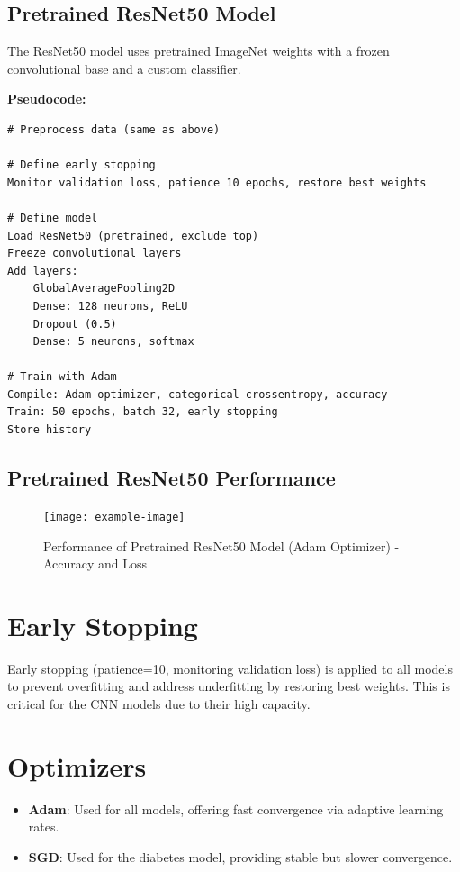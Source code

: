 \documentclass[a4paper,12pt]{article}
\begin{document}
\subsection*{Pretrained ResNet50 Model}
The ResNet50 model uses pretrained ImageNet weights with a frozen convolutional base and a custom classifier.

\textbf{Pseudocode:}
\begin{verbatim}
# Preprocess data (same as above)

# Define early stopping
Monitor validation loss, patience 10 epochs, restore best weights

# Define model
Load ResNet50 (pretrained, exclude top)
Freeze convolutional layers
Add layers:
    GlobalAveragePooling2D
    Dense: 128 neurons, ReLU
    Dropout (0.5)
    Dense: 5 neurons, softmax

# Train with Adam
Compile: Adam optimizer, categorical crossentropy, accuracy
Train: 50 epochs, batch 32, early stopping
Store history
\end{verbatim}

\subsection*{Pretrained ResNet50 Performance}
\begin{figure}[H]
    \centering
    \texttt{[image: example-image]}
    \caption{Performance of Pretrained ResNet50 Model (Adam Optimizer) - Accuracy and Loss}
\end{figure}

\section*{Early Stopping}
Early stopping (patience=10, monitoring validation loss) is applied to all models to prevent overfitting and address underfitting by restoring best weights. This is critical for the CNN models due to their high capacity.

\section*{Optimizers}
\begin{itemize}
    \item \textbf{Adam}: Used for all models, offering fast convergence via adaptive learning rates.
    \item \textbf{SGD}: Used for the diabetes model, providing stable but slower convergence.
\end{itemize}
\end{document}
